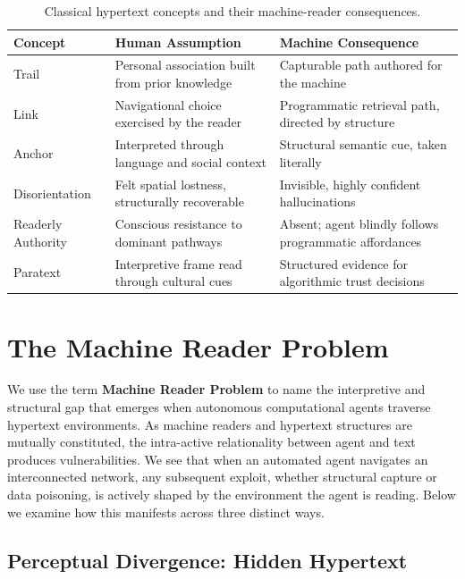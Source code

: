 \documentclass[sigconf,authordraft]{acmart}
\begin{document}
\begin{table}[t]
  \caption{Classical hypertext concepts and their machine-reader consequences.}
  \label{tab:concepts}
  \small
  \begin{tabular}{p{1.6cm}p{2.7cm}p{3.1cm}}
    \toprule
    \textbf{Concept} & \textbf{Human Assumption} & \textbf{Machine Consequence} \\
    \midrule
    Trail \cite{bush1945}
      & Personal association built from prior knowledge
      & Capturable path authored for the machine \\[3pt]
    Link \cite{nelson1965}
      & Navigational choice exercised by the reader
      & Programmatic retrieval path, directed by structure \\[3pt]
    Anchor \cite{nelson1965}
      & Interpreted through language and social context
      & Structural semantic cue, taken literally \\[3pt]
    Disorientation \cite{conklin1987}
      & Felt spatial lostness, structurally recoverable
      & Invisible, highly confident hallucinations \\[3pt]
    Readerly Authority \cite{landow2006hypertext}
      & Conscious resistance to dominant pathways
      & Absent; agent blindly follows programmatic affordances \\[3pt]
    Paratext \cite{genette1997}
      & Interpretive frame read through cultural cues
      & Structured evidence for algorithmic trust decisions \\
    \bottomrule
  \end{tabular}
\end{table}

\section{The Machine Reader Problem}

We use the term \textbf{Machine Reader Problem} to name the interpretive and
structural gap that emerges when autonomous computational agents traverse
hypertext environments. As machine readers and hypertext structures
are mutually constituted, the intra-active relationality between agent
and text produces vulnerabilities. We see that when an automated agent navigates an interconnected network,
any subsequent exploit, whether structural capture or data poisoning, is actively
shaped by the environment the agent is reading. Below we examine how this
manifests across three distinct ways.

\subsection{Perceptual Divergence: Hidden Hypertext}
\end{document}
